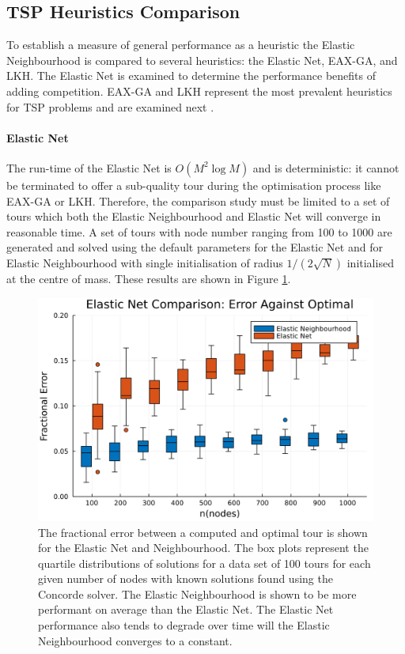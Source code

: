 \subsection{TSP Heuristics Comparison}
To establish a measure of general performance as a heuristic the Elastic Neighbourhood is compared to several heuristics: the Elastic Net, EAX-GA, and LKH. The Elastic Net is examined to determine the performance benefits of adding competition. EAX-GA and LKH represent the most prevalent heuristics for TSP problems and are examined next \cite{McMenemy2019-rl}. 
\paragraph{Elastic Net}
The run-time of the Elastic Net is $O(M^2 \log M )$ and is deterministic: it cannot be terminated to offer a sub-quality tour during the optimisation process like EAX-GA or LKH. Therefore, the comparison study must be limited to a set of tours which both the Elastic Neighbourhood and Elastic Net will converge in reasonable time. A set of tours with node number ranging from 100 to 1000 are generated and solved using the default parameters for the Elastic Net and for Elastic Neighbourhood with single initialisation of radius $1/(2\sqrt{N})$ initialised at the centre of mass. These results are shown in Figure \ref{fig:elasticneighbourhoodvsnet}.

\begin{figure}[h]
	\centering
	\includegraphics[width=\textwidth]{images/elastic_neighbourhood/fig_elastic_net_comparison}
	\def\c{The fractional error between a computed and optimal tour is shown for the Elastic Net and Neighbourhood. }
	\caption[\c]{\label{fig:elasticneighbourhoodvsnet} \c The box plots represent the quartile distributions of solutions for a data set of 100 tours for each given number of nodes with known solutions found using the Concorde solver. The Elastic Neighbourhood is shown to be more performant on average than the Elastic Net. The Elastic Net performance also tends to degrade over time will the Elastic Neighbourhood converges to a constant.}
\end{figure}

